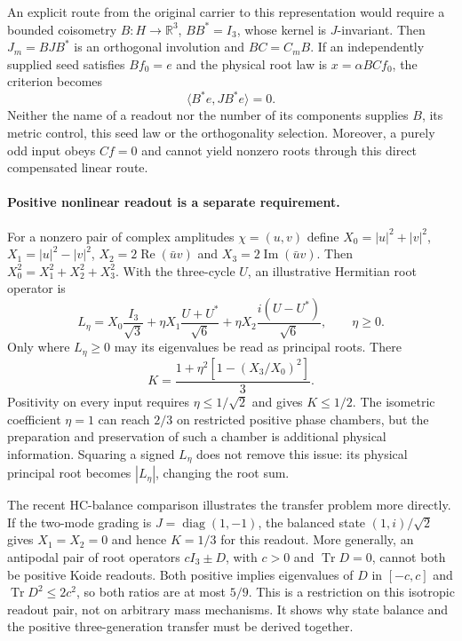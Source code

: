 An explicit route from the original carrier to this representation
would require a bounded coisometry $B:H\to\mathbb R^3$, $BB^*=I_3$,
whose kernel is $J$-invariant. Then $J_m=BJB^*$ is an orthogonal
involution and $BC=C_mB$. If an independently supplied seed satisfies
$Bf_0=e$ and the physical root law is $x=\alpha BCf_0$, the criterion
becomes
\begin{equation}
 \langle B^*e,JB^*e\rangle=0.
\end{equation}
Neither the name of a readout nor the number of its components supplies
$B$, its metric control, this seed law or the orthogonality selection.
Moreover, a purely odd input obeys $Cf=0$ and cannot yield nonzero roots
through this direct compensated linear route.

\paragraph{Positive nonlinear readout is a separate requirement.}
For a nonzero pair of complex amplitudes $\chi=(u,v)$ define
$X_0=|u|^2+|v|^2$, $X_1=|u|^2-|v|^2$,
$X_2=2\operatorname{Re}(\bar uv)$ and
$X_3=2\operatorname{Im}(\bar uv)$. Then
$X_0^2=X_1^2+X_2^2+X_3^2$. With the three-cycle $U$, an illustrative
Hermitian root operator is
\begin{equation}
 L_\eta=X_0\frac{I_3}{\sqrt3}
 +\eta X_1\frac{U+U^*}{\sqrt6}
 +\eta X_2\frac{i(U-U^*)}{\sqrt6},\qquad \eta\geq0.
\end{equation}
Only where $L_\eta\geq0$ may its eigenvalues be read as principal
roots. There
\begin{equation}
 K=\frac{1+\eta^2[1-(X_3/X_0)^2]}3.
\end{equation}
Positivity on every input requires $\eta\leq1/\sqrt2$ and gives
$K\leq1/2$. The isometric coefficient $\eta=1$ can reach $2/3$
on restricted positive phase chambers, but the preparation and
preservation of such a chamber is additional physical information.
Squaring a signed $L_\eta$ does not remove this issue: its physical
principal root becomes $|L_\eta|$, changing the root sum.

The recent HC-balance comparison illustrates the transfer problem
more directly. If the two-mode grading is $J=\operatorname{diag}(1,-1)$,
the balanced state $(1,i)/\sqrt2$ gives $X_1=X_2=0$ and hence $K=1/3$
for this readout. More generally, an antipodal pair of root operators
$cI_3\pm D$, with $c>0$ and $\operatorname{Tr}D=0$, cannot both
be positive Koide readouts. Both positive implies eigenvalues of $D$
in $[-c,c]$ and $\operatorname{Tr}D^2\leq2c^2$, so both ratios
are at most $5/9$. This is a restriction on this isotropic readout
pair, not on arbitrary mass mechanisms. It shows why state balance
and the positive three-generation transfer must be derived together.

